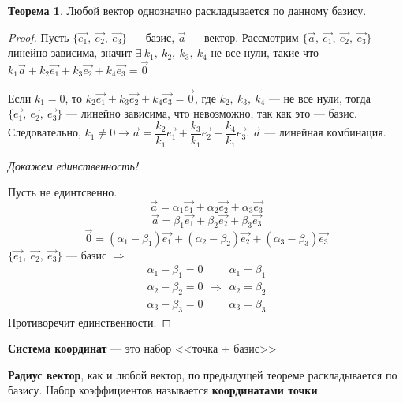 \documentclass{article}
\theoremstyle{definition}
\newtheorem{theorem}{Теорема}[section]
\begin{document}
\begin{theorem}
Любой вектор однозначно раскладывается по данному базису.
\begin{proof}
Пусть $\{\overrightarrow{e_1},\ \overrightarrow{e_2},\ \overrightarrow{e_3}\}$ --- базис, $\overrightarrow{a}$ --- вектор. Рассмотрим $\{\overrightarrow{a},\ \overrightarrow{e_1},\ \overrightarrow{e_2},\ \overrightarrow{e_3}\}$ --- линейно зависима, значит $\exists\ k_1,\ k_2,\ k_3,\ k_4 $ не все нули, такие что $k_1\overrightarrow{a} + k_2\overrightarrow{e_1} + k_3\overrightarrow{e_2} + k_4\overrightarrow{e_3} = \overrightarrow{0}$

Если $k_1 = 0$, то $k_2\overrightarrow{e_1} + k_3\overrightarrow{e_2} + k_4\overrightarrow{e_3} = \overrightarrow{0}$, где $k_2,\ k_3,\ k_4 $ --- не все нули, тогда $\{\overrightarrow{e_1},\ \overrightarrow{e_2},\ \overrightarrow{e_3}\}$ --- линейно зависима, что невозможно, так как это --- базис. Следовательно, $k_1\neq 0 \longrightarrow \vec a = \dfrac{k_2}{k_1}\overrightarrow{e_1} + \dfrac{k_3}{k_1}\overrightarrow{e_2} + \dfrac{k_4}{k_1}\overrightarrow{e_3}$. $\vec a$ --- линейная комбинация.

\textit{Докажем единственность!}

Пусть не единтсвенно.
$$\vec a = \alpha_1 \overrightarrow{e_1} + \alpha_2 \overrightarrow{e_2} + \alpha_3 \overrightarrow{e_3}$$
$$\vec a = \beta_1  \overrightarrow{e_1} + \beta_2  \overrightarrow{e_2} + \beta_3  \overrightarrow{e_3}$$
$$\vec 0 = (\alpha_1 - \beta_1)\overrightarrow{e_1} + (\alpha_2 - \beta_2)\overrightarrow{e_2} + (\alpha_3 - \beta_3)\overrightarrow{e_3}$$
$\{\overrightarrow{e_1},\ \overrightarrow{e_2},\ \overrightarrow{e_3}\}$ --- базис $\Longrightarrow$
$$
\begin{array}{c}
    \alpha_1 - \beta_1 = 0 \\
    \alpha_2 - \beta_2 = 0 \\
    \alpha_3 - \beta_3 = 0
\end{array}
\Longrightarrow
\begin{array}{c}
     \alpha_1 = \beta_1 \\
     \alpha_2 = \beta_2 \\
     \alpha_3 = \beta_3
\end{array}
$$
Противоречит единственности.
\end{proof}
\end{theorem}

\textbf{Система координат } --- это набор <<точка + базис>>

\textbf{Радиус вектор}, как и любой вектор, по предыдущей теореме раскладывается по базису. Набор коэффициентов называется \textbf{координатами точки}.
\end{document}
